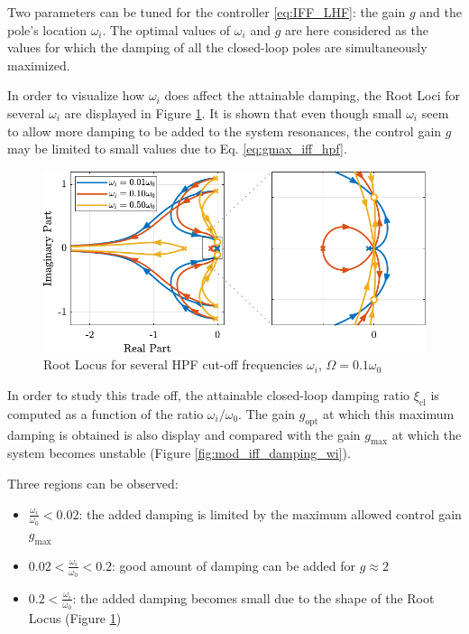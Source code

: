\documentclass{ISMA_USD2020}
\begin{document}
\par
Two parameters can be tuned for the controller \eqref{eq:IFF_LHF}: the gain \(g\) and the pole's location \(\omega_i\).
The optimal values of \(\omega_i\) and \(g\) are here considered as the values for which the damping of all the closed-loop poles are simultaneously maximized.

In order to visualize how \(\omega_i\) does affect the attainable damping, the Root Loci for several \(\omega_i\) are displayed in Figure \ref{fig:root_locus_wi_modified_iff}.
It is shown that even though small \(\omega_i\) seem to allow more damping to be added to the system resonances, the control gain \(g\) may be limited to small values due to Eq. \eqref{eq:gmax_iff_hpf}.

\begin{figure}[htbp]
\centering
\includegraphics[scale=1]{figs/root_locus_wi_modified_iff.pdf}
\caption{\label{fig:root_locus_wi_modified_iff}Root Locus for several HPF cut-off frequencies \(\omega_i\), \(\Omega = 0.1 \omega_0\)}
\end{figure}

In order to study this trade off, the attainable closed-loop damping ratio \(\xi_{\text{cl}}\) is computed as a function of the ratio \(\omega_i/\omega_0\).
The gain \(g_{\text{opt}}\) at which this maximum damping is obtained is also display and compared with the gain \(g_{\text{max}}\) at which the system becomes unstable (Figure \ref{fig:mod_iff_damping_wi}).

Three regions can be observed:
\begin{itemize}
\item \(\frac{\omega_i}{\omega_0} < 0.02\): the added damping is limited by the maximum allowed control gain \(g_{\text{max}}\)
\item \(0.02 < \frac{\omega_i}{\omega_0} < 0.2\): good amount of damping can be added for \(g \approx 2\)
\item \(0.2 < \frac{\omega_i}{\omega_0}\): the added damping becomes small due to the shape of the Root Locus (Figure \ref{fig:root_locus_wi_modified_iff})
\end{itemize}
\end{document}
